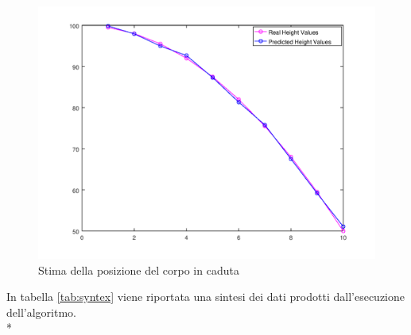 \begin{figure}[h]
	\centering
	\includegraphics[scale=0.7]{img/predheight}
	\caption{Stima della posizione del corpo in caduta}
	\label{fig:predheight}
\end{figure}
\newpage
In tabella \ref{tab:syntex} viene riportata una sintesi dei dati prodotti dall'esecuzione dell'algoritmo.\\*

